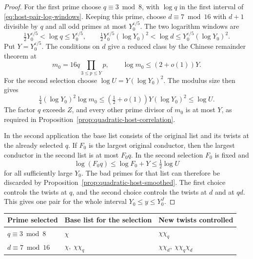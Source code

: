 \begin{proof}

For the first prime choose \(q\equiv3\bmod 8\), with
\(\log q\) in the first interval of \eqref{eq:host-pair-log-windows}.
Keeping this prime, choose \(d\equiv7\bmod16\) with \(d+1\)
divisible by \(q\) and all odd primes at most \(Y_0^{\varepsilon/5}\).
The two logarithm windows are
\begin{equation}\label{eq:host-pair-log-windows}
 \tfrac12Y_0^{\varepsilon/5}<\log q\le Y_0^{\varepsilon/5},\qquad
 \tfrac12Y_0^{\varepsilon/5}(\log Y_0)^2<\log d
           \le Y_0^{\varepsilon/5}(\log Y_0)^2 .
\end{equation}
Put \(Y=Y_0^{\varepsilon/5}\). The conditions on \(d\)
give a reduced class by the Chinese remainder theorem at
\[
 m_0=16q\prod_{3\le p\le Y}p,\qquad
 \log m_0\le (2+o(1))Y.
\]
For the second selection choose \(\log U=Y(\log Y_0)^2\).
The modulus size then gives
\[
 \tfrac14(\log Y_0)^2\log m_0
 \le (\tfrac12+o(1))Y(\log Y_0)^2\le\log U .
\]
The factor \(q\) exceeds \(Z\), and every other prime
divisor of \(m_0\) is at most \(Y\), as required in
Proposition~\ref{prop:quadratic-host-correlation}.

In the second application the base list consists of the original
list and its twists at the already selected \(q\).
If \(F_0\) is the largest original conductor, then the
largest conductor in the second list is at most \(F_0q\).
In the second selection \(F_0\) is fixed and
\[
  \log(F_0q)\le\log F_0+Y\le\tfrac12\log U
\]
for all sufficiently large \(Y_0\). The bad primes for that
list can therefore be discarded by
Proposition~\ref{prop:quadratic-host-smoothed}.
The first choice controls the twists at \(q\), and the
second choice controls the twists at \(d\) and at \(qd\).
This gives one pair for the whole interval \(Y_0\le y\le Y_0^J\).

\end{proof}

\begin{construction}
\begin{tabular}{@{}lll@{}}\toprule
Prime selected & Base list for the selection & New twists controlled\\\midrule
\(q\equiv3\bmod8\) & \(\chi\) & \(\chi\chi_q\)\\
\(d\equiv7\bmod16\) & \(\chi,\ \chi\chi_q\) &
\(\chi\chi_d,\ \chi\chi_q\chi_d\)\\\bottomrule
\end{tabular}
\caption{Selecting one ordered pair for all characters \(\chi\) in the fixed list and all scales \(Y_0\le y\le Y_0^J\). Here \(\chi_p\) is the quadratic character at \(p\), and each product denotes its inducing primitive character.}\label{fig:ordered-prime-twist-list}
\end{construction}


